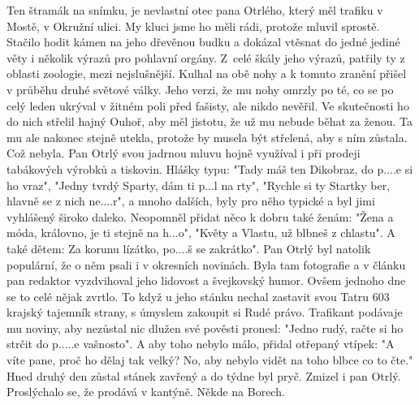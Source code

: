 
Ten štramák na snímku, je nevlastní otec pana Otrlého, který měl
trafiku v Mostě, v Okružní ulici. My kluci jsme ho měli rádi, protože
mluvil sprostě. Stačilo hodit kámen na jeho dřevěnou budku a dokázal
vtěsnat do jedné jediné věty i několik výrazů pro pohlavní orgány.
Z~celé škály jeho výrazů, patřily ty z oblasti zoologie, mezi
nejslušnější. Kulhal na obě nohy a k tomuto zranění přišel v průběhu
druhé světové války. Jeho verzi, že mu nohy omrzly po té, co se po
celý leden ukrýval v žitném poli před fašisty, ale nikdo nevěřil. Ve
skutečnosti ho do nich střelil hajný Ouhoř, aby měl jistotu, že už mu
nebude běhat za ženou. Ta mu ale nakonec stejně utekla, protože by
musela být střelená, aby s ním zůstala. Což nebyla. Pan Otrlý svou
jadrnou mluvu hojně využíval i při prodeji tabákových výrobků a
tiskovin. Hlášky typu: "Tady máš ten Dikobraz, do p....e si ho vraz",
"Jedny tvrdý Sparty, dám ti p...l na rty", "Rychle si ty Startky ber,
hlavně se z nich ne....r", a mnoho dalších, byly pro něho typické a
byl jimi vyhlášený široko daleko. Neopomněl přidat něco k dobru také
ženám: "Žena a móda, královno, je ti stejně na h...o", "Květy a
Vlastu, už blbneš z chlastu". A také dětem: Za korunu lízátko, po....š
se zakrátko". Pan Otrlý byl natolik populární, že o něm psali i v
okresních novinách. Byla tam fotografie a v článku pan redaktor
vyzdvihoval jeho lidovost a švejkovský humor. Ovšem jednoho dne se to
celé nějak zvrtlo. To když u jeho stánku nechal zastavit svou Tatru
603 krajský tajemník strany, s úmyslem zakoupit si Rudé právo.
Trafikant podávaje mu noviny, aby nezůstal nic dlužen své pověsti
pronesl: "Jedno rudý, račte si ho strčit do p.....e vašnosto". A aby
toho nebylo málo, přidal otřepaný vtípek: "A víte pane, proč ho dělaj
tak velký? No, aby nebylo vidět na toho blbce co to čte." Hned druhý
den zůstal stánek zavřený a do týdne byl pryč. Zmizel i pan Otrlý.
Proslýchalo se, že prodává v kantýně. Někde na Borech.

